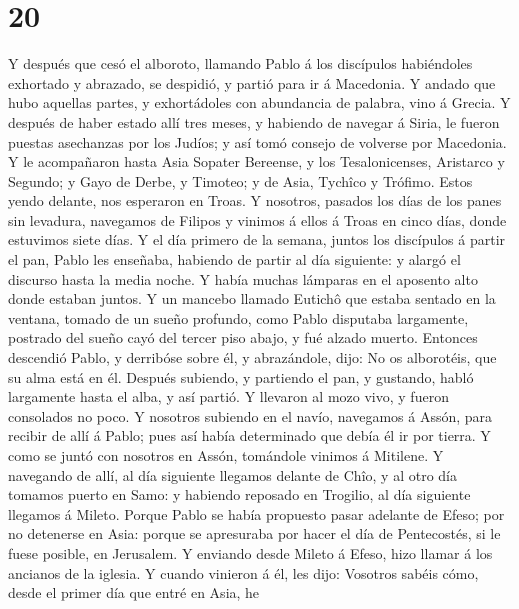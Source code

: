 \hypertarget{section-19}{%
\section{20}\label{section-19}}

 Y después que cesó el alboroto, llamando Pablo á los
discípulos habiéndoles exhortado y abrazado, se despidió, y partió para
ir á Macedonia.  Y andado que hubo aquellas partes, y
exhortádoles con abundancia de palabra, vino á Grecia.  Y
después de haber estado allí tres meses, y habiendo de navegar á Siria,
le fueron puestas asechanzas por los Judíos; y así tomó consejo de
volverse por Macedonia.  Y le acompañaron hasta Asia Sopater
Bereense, y los Tesalonicenses, Aristarco y Segundo; y Gayo de Derbe, y
Timoteo; y de Asia, Tychîco y Trófimo.  Estos yendo delante,
nos esperaron en Troas.  Y nosotros, pasados los días de los
panes sin levadura, navegamos de Filipos y vinimos á ellos á Troas en
cinco días, donde estuvimos siete días.  Y el día primero de
la semana, juntos los discípulos á partir el pan, Pablo les enseñaba,
habiendo de partir al día siguiente: y alargó el discurso hasta la media
noche.  Y había muchas lámparas en el aposento alto donde
estaban juntos.  Y un mancebo llamado Eutichô que estaba
sentado en la ventana, tomado de un sueño profundo, como Pablo disputaba
largamente, postrado del sueño cayó del tercer piso abajo, y fué alzado
muerto.  Entonces descendió Pablo, y derribóse sobre él, y
abrazándole, dijo: No os alborotéis, que su alma está en él.
 Después subiendo, y partiendo el pan, y gustando, habló
largamente hasta el alba, y así partió.  Y llevaron al mozo
vivo, y fueron consolados no poco.  Y nosotros subiendo en
el navío, navegamos á Assón, para recibir de allí á Pablo; pues así
había determinado que debía él ir por tierra.  Y como se
juntó con nosotros en Assón, tomándole vinimos á Mitilene. 
Y navegando de allí, al día siguiente llegamos delante de Chîo, y al
otro día tomamos puerto en Samo: y habiendo reposado en Trogilio, al día
siguiente llegamos á Mileto.  Porque Pablo se había
propuesto pasar adelante de Efeso; por no detenerse en Asia: porque se
apresuraba por hacer el día de Pentecostés, si le fuese posible, en
Jerusalem.  Y enviando desde Mileto á Efeso, hizo llamar á
los ancianos de la iglesia.  Y cuando vinieron á él, les
dijo: Vosotros sabéis cómo, desde el primer día que entré en Asia, he
